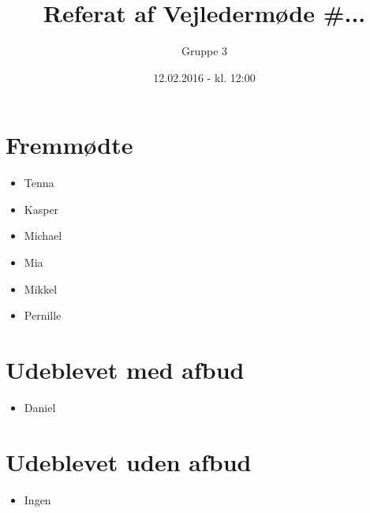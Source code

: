 \documentclass{article}
\title{Referat af Vejledermøde \#...}
\author{Gruppe 3}
\date{12.02.2016 - kl. 12:00}
\begin{document}
	\maketitle
	
	\section{Fremmødte}
	\begin{itemize}
		\item Tenna
		\item Kasper 
		\item Michael 
		\item Mia 
		\item Mikkel 
		\item Pernille 
	\end{itemize}
	
	\section{Udeblevet med afbud}
	\begin{itemize}
		\item Daniel
	\end{itemize}
	
	\section{Udeblevet uden afbud}
	\begin{itemize}
		\item Ingen
	\end{itemize}
	
\end{document}
